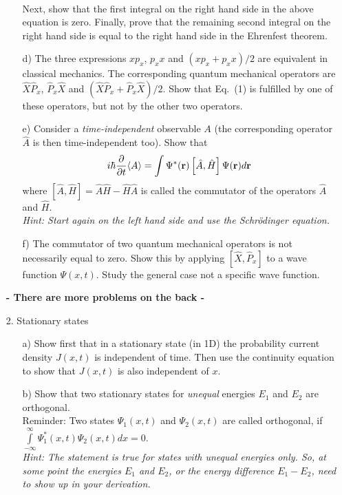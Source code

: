 \documentclass[11pt]{article}
\begin{document}
\begin{itemize}
\begin{itemize}
{\begin{eqnarray*}
\end{eqnarray*}
Next, show that the first integral on the right hand side in the above equation is zero. Finally, prove that the remaining second integral on the right hand side is equal to the right hand side in the Ehrenfest theorem.
}
\item[d)]
The three expressions $xp_x$, $p_xx$ and $(xp_x+p_xx)/2$ are equivalent in classical mechanics. The corresponding
quantum mechanical operators are $\hat X \hat P_x$, $\hat P_x \hat X$ and $(\hat X\hat P_x+\hat P_x\hat X)/2$.
Show that Eq.\ (1) is fulfilled by one of these operators, but not by the other two operators.
\item[e)]
Consider a {\it time-independent} observable $A$ (the corresponding operator ${\hat A}$ is then time-independent too).
Show that
\begin{displaymath}
i\hbar \frac{\partial}{\partial t}\langle A \rangle = \int \Psi^*({\bf r})\left[ {\hat A}, {\hat H}\right] \Psi({\bf r}) d{\bf r}
\end{displaymath}
where $\left[ {\hat A}, {\hat H}\right] = {\hat A}{\hat H} - {\hat H}{\hat A}$ is called the commutator of the operators ${\hat A}$ and ${\hat H}$.\\
{\it Hint: Start again on the left hand side and use the Schr\"odinger equation.}
\item[f)]
The commutator of two quantum mechanical operators is not necessarily equal to zero. Show this by applying $[{\hat X},{\hat P_x}]$ to a wave function $\Psi(x,t)$. Study the general case not a specific wave function.
\end{itemize}
%
\centerline{\bf - There are more problems on the back - }
%
\newpage
%
\item[2.] Stationary states
\begin{itemize}
\item[a)]
Show first that in a stationary state (in 1D) the probability current density $J(x,t)$ is independent of time. Then use the continuity equation to show that $J(x,t)$ is also independent of $x$.
\item[b)]
Show that two stationary states for {\it unequal} energies $E_1$ and $E_2$
are orthogonal.\\ 
Reminder: Two states $\Psi_1(x,t)$ and $\Psi_2(x,t)$ are called orthogonal, if\\ $\int\limits_{-\infty}^{\infty} {\Psi^*_1}(x,t){\Psi_2(x,t)}dx = 0$.\\
{\it Hint: The statement is true for states with unequal energies only. So, at some point the energies $E_1$ and $E_2$, or the energy difference $E_1-E_2$, need to show up in your derivation.}

\end{itemize}
\end{itemize}
\end{document}
